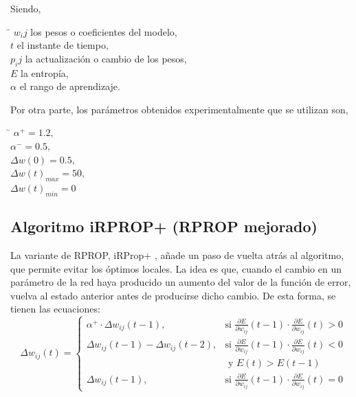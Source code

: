 			Siendo,
			\begin{tabbing}
			\hspace{1 cm}\=\kill
			 \> $ w_ij $ los pesos o coeficientes del modelo,\\
			 \> $ t $ el instante de tiempo,\\
			 \> $ p_ij $ la actualización o cambio de los pesos,\\
			 \> $ E $ la entropía,\\
			 \> $ \alpha $ el rango de aprendizaje.
			\end{tabbing}
			
			Por otra parte, los parámetros obtenidos experimentalmente que se utilizan son,
			\begin{tabbing}
			\hspace{1 cm}\=\kill
			 \> $ \alpha^+ = 1.2, $\\ 
			 \> $ \alpha^- = 0.5, $\\ 
			 \> $ \Delta w(0) = 0.5, $\\ 
			 \> $ \Delta w(t)_{max} = 50, $\\ 
			 \> $ \Delta w(t)_{min} = 0 $
			\end{tabbing}
	
		\subsection{Algoritmo iRPROP+ (RPROP mejorado)}
	
			La variante de RPROP, iRProp+ \cite{iRPROP+}, añade un paso de vuelta atrás al algoritmo, que permite evitar los óptimos locales. La idea es que, cuando el cambio en un parámetro de la red haya producido un aumento del valor de la función de error, vuelva al estado anterior antes de producirse dicho cambio. De esta forma, se tienen las ecuaciones:\\
			
			\begin{equation}
				\Delta w_{ij} (t) = 
				\begin{cases}
					{ \alpha^+ \cdot{} \Delta w_{ij}(t-1),} & \mbox{si } \frac{ \partial E}{ \partial w_{ij}}(t-1) \cdot{} \frac{ \partial E}{ \partial w_{ij}}(t) > 0 \nonumber \\
					{ \Delta w_{ij}(t-1)-\Delta w_{ij}(t-2),} & \mbox{si } \frac{ \partial E}{ \partial w_{ij}}(t-1) \cdot{} \frac{ \partial E}{ \partial w_{ij}}(t) < 0 \nonumber \\
					& \mbox{ y } E(t) > E(t-1) \\
					\Delta w_{ij}(t-1), & \mbox{si } \frac{ \partial E}{ \partial w_{ij}}(t-1) \cdot{} \frac{ \partial E}{ \partial w_{ij}}(t) = 0 \nonumber
				\end{cases}
				\label{irprop+}
			\end{equation}
	

